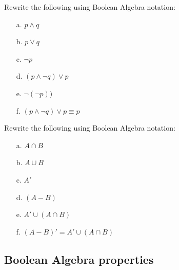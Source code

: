 \documentclass[a4paper,12pt]{book}
\newcounter{question}
\begin{document}
		\newpage

        \begin{questionNOGRADE}{\thequestion}

			Rewrite the following using Boolean Algebra notation:

			\begin{enumerate}
				\item[a.] 	$p \land q$							
				\item[b.] 	$p \lor q$								
				\item[c.] 	$\neg p$								
				\item[d.]	$(p \land \neg q) \lor p$			
				\item[e.]	$\neg(\neg p))$						
				\item[f.]	$(p \land \neg q) \lor p \equiv p$	
			\end{enumerate}

        \end{questionNOGRADE}

		\hrulefill

        \begin{questionNOGRADE}{\thequestion}

			Rewrite the following using Boolean Algebra notation:

			\begin{enumerate}
				\item[a.] 	$A \cap B$								
				\item[b.] 	$A \cup B$								
				\item[c.] 	$A'$									
				\item[d.]	$(A-B)$									
				\item[e.]	$A' \cup (A \cap B)$					
				\item[f.]	$(A - B)' = A' \cup (A \cap B)$		
			\end{enumerate}

        \end{questionNOGRADE}

    \newpage
    \subsection{Boolean Algebra properties}
\end{document}
